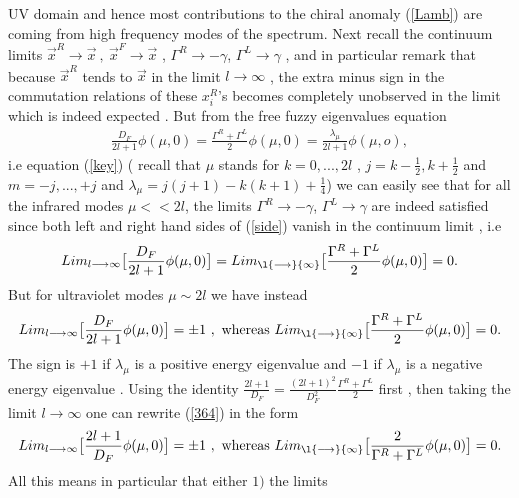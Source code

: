 \documentclass[a4paper,10pt]{article}
\begin{document}
UV domain and hence most contributions to the chiral anomaly
(\ref{Lamb}) are coming from high frequency modes of the
spectrum. Next recall the continuum limits $
\vec{x}^R{\longrightarrow}\vec{x}~,~\vec{x}^F{\longrightarrow}\vec{x}$
, ${\Gamma}^R{\longrightarrow}-{\gamma}$,
${\Gamma}^L{\longrightarrow}{\gamma}$ , and in particular remark
that because $\vec{x}^R$ tends to $\vec{x}$ in the limit
$l{\longrightarrow}{\infty}$ , the extra minus sign in the
commutation relations of these $x^R_i$'s becomes completely
unobserved in the limit which is indeed expected . But from the
free fuzzy eigenvalues equation
\begin{eqnarray}
\frac{D_F}{2l+1}{\phi}(\mu,0)=\frac{{\Gamma}^R+{\Gamma}^L}{2}{\phi}(\mu,0)=\frac{{\lambda}_{\mu}}{2l+1}{\phi}(\mu,o),\label{side}
\end{eqnarray}
i.e equation (\ref{key}) ( recall that ${\mu}$ stands for
$k=0,...,2l$ , $j=k-\frac{1}{2},k+\frac{1}{2}$ and $m=-j,...,+j$
and ${\lambda}_{\mu}=j(j+1)-k(k+1)+\frac{1}{4}$) we can easily
see that for all the infrared modes $\mu<<2l$, the limits
${\Gamma}^R{\longrightarrow}-{\gamma}$,
${\Gamma}^L{\longrightarrow}{\gamma}$ are indeed satisfied since
both left and right hand sides of (\ref{side}) vanish in the
continuum limit , i.e
\begin{eqnarray}
Lim_{l{\longrightarrow}{\infty}}\big[\frac{D_F}{2l+1}{\phi}(\mu,0)\big]=Lim_{\l{\longrightarrow}{\infty}}\big[\frac{{\Gamma}^R+{\Gamma}^L}{2}{\phi}(\mu,0)\big]=0.
\end{eqnarray}
But for ultraviolet modes $\mu{\sim}2l$ we have instead
\begin{eqnarray}
Lim_{l{\longrightarrow}{\infty}}\big[\frac{D_F}{2l+1}{\phi}(\mu,0)\big]={\pm}1~,~{\rm
whereas}~
Lim_{\l{\longrightarrow}{\infty}}\big[\frac{{\Gamma}^R+{\Gamma}^L}{2}{\phi}(\mu,0)\big]=0.\label{364}
\end{eqnarray}
The sign is $+1$ if ${\lambda}_{\mu}$ is a positive energy
eigenvalue and $-1$ if ${\lambda}_{\mu}$ is a negative energy
eigenvalue . Using the identity
$\frac{2l+1}{D_F}=\frac{(2l+1)^2}{D^2_F}\frac{{\Gamma}^R+{\Gamma}^L}{2}$
first , then taking the limit $l{\longrightarrow}{\infty}$ one can
rewrite (\ref{364}) in the form
\begin{eqnarray}
Lim_{l{\longrightarrow}{\infty}}\big[\frac{2l+1}{D_F}{\phi}(\mu,0)\big]={\pm}1~,~{\rm
whereas}~
Lim_{\l{\longrightarrow}{\infty}}\big[\frac{2}{{\Gamma}^R+{\Gamma}^L}{\phi}(\mu,0)\big]=0.\label{365}
\end{eqnarray}
All this means in particular that either $1)$ the limits
\end{document}
